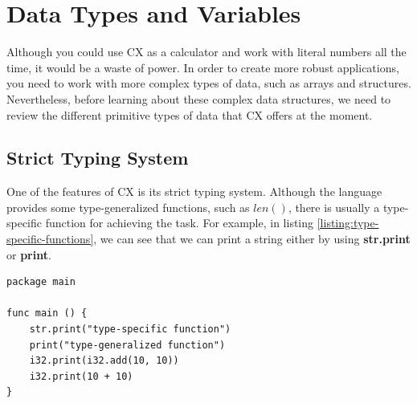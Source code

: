 \documentclass[11pt,fleqn,openany]{book} %
\begin{document}
\chapter{Data Types and Variables}
\label{chapter:data-types}

Although you could use CX as a calculator and work with literal numbers all the time, it would be a waste of power. In order to create more robust applications, you need to work with more complex types of data, such as arrays and structures. Nevertheless, before learning about these complex data structures, we need to review the different primitive types of data that CX offers at the moment.

\section{Strict Typing System}


One of the features of CX is its strict typing system. Although the language provides some type-generalized functions, such as $len()$, there is usually a type-specific function for achieving the task. For example, in listing \ref{listing:type-specific-functions}, we can see that we can print a string either by using \textbf{str.print} or \textbf{print}.

\begin{lstlisting}[caption={Type-specific functions},captionpos=b,label={listing:type-specific-functions}]
package main

func main () {
 	str.print("type-specific function")
    print("type-generalized function")
    i32.print(i32.add(10, 10))
    i32.print(10 + 10)
}
\end{lstlisting}
\end{document}
